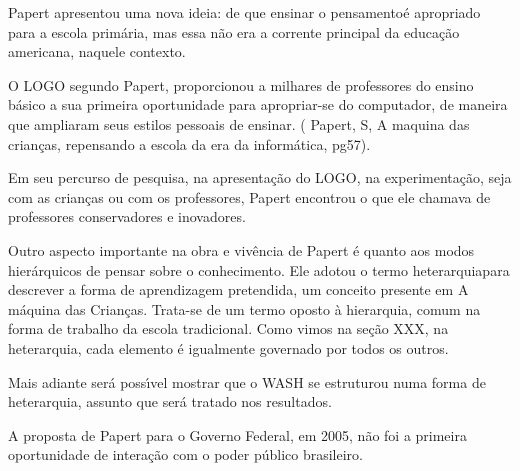 \documentclass[
12pt,		%
openright,	%
twoside,  %
a4paper,			%
chapter=TITLE,		%
english,			%
french,				%
spanish,			%
brazil				%
]{USPSC-classe/USPSC}
\begin{document}
Papert apresentou uma nova ideia: de que \textquotedbl ensinar o pensamento\textquotedbl   \'e apropriado para a escola prim\'aria, mas essa n\~ao era a corrente principal da educa\c{c}\~ao americana, naquele contexto.









O LOGO segundo Papert,  proporcionou a milhares de professores do ensino b\'asico a sua primeira oportunidade para apropriar-se do computador, de maneira que ampliaram seus estilos pessoais de ensinar. ( Papert, S, \textquotedbl A maquina das crian\c{c}as, repensando a escola da era da inform\'atica\textquotedbl  , pg57).









Em seu percurso de pesquisa, na apresenta\c{c}\~ao do LOGO, na experimenta\c{c}\~ao, seja com as crian\c{c}as ou com os professores, Papert encontrou o que ele chamava de \textquotedbl professores conservadores e  inovadores\textquotedbl  [XXX].









Outro aspecto importante na obra e viv\^encia de Papert \'e quanto aos modos hier\'arquicos de pensar sobre o conhecimento.  Ele adotou o termo  \textquotedbl heterarquia\textquotedbl  para descrever a forma de aprendizagem pretendida, um conceito presente em  \textquotedbl A m\'aquina das Crian\c{c}as\textquotedbl . Trata-se de  um termo oposto \`a hierarquia, comum na forma de trabalho da escola tradicional. Como vimos na se\c{c}\~ao XXX, na heterarquia, cada elemento \'e igualmente governado por todos os outros.









Mais adiante ser\'a poss\'{\i}vel mostrar que o WASH se estruturou numa forma de heterarquia, assunto que ser\'a tratado nos resultados.









A proposta de Papert para o Governo Federal, em 2005, n\~ao foi a primeira oportunidade de intera\c{c}\~ao com o poder p\'ublico brasileiro.
\end{document}
